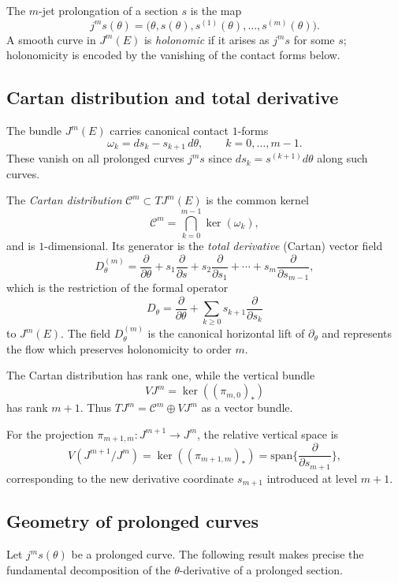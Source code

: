 \documentclass[3p,times]{elsarticle}
\begin{document}
The $m$-jet prolongation of a section $s$ is the map
\[
 j^{m}s(\theta)=\big(\theta, s(\theta), s^{(1)}(\theta),\ldots,s^{(m)}(\theta)\big).
\]
A smooth curve in $J^{m}(E)$ is \emph{holonomic} if it arises as $j^{m}s$ for some $s$; holonomicity is encoded
by the vanishing of the contact forms below.

\subsection{Cartan distribution and total derivative}

The bundle $J^{m}(E)$ carries canonical contact $1$-forms
\[
 \omega_k = ds_k - s_{k+1}\,d\theta,\qquad k=0,\ldots,m-1.
\]
These vanish on all prolonged curves $j^m s$ since $ds_k = s^{(k+1)} d\theta$ along such curves.

The {\em Cartan distribution} $\mathcal{C}^{m}\subset TJ^{m}(E)$ is the common kernel
\[
 \mathcal{C}^{m}=\bigcap_{k=0}^{m-1}\ker(\omega_k),
\]
and is $1$-dimensional.  Its generator is the {\em total derivative} (Cartan) vector field
\begin{equation}
\label{eq:total-derivative}
D^{(m)}_\theta
 = \frac{\partial}{\partial \theta} 
   + s_1\frac{\partial}{\partial s}
   + s_2\frac{\partial}{\partial s_1}
   + \cdots
   + s_m\frac{\partial}{\partial s_{m-1}},
\end{equation}
which is the restriction of the formal operator
\[
 D_\theta 
   = \frac{\partial}{\partial \theta}
     + \sum_{k\ge 0} s_{k+1}\frac{\partial}{\partial s_k}
\]
to $J^{m}(E)$.  
The field $D^{(m)}_\theta$ is the canonical horizontal lift of $\partial_\theta$ and represents the flow
which preserves holonomicity to order $m$.

The Cartan distribution has rank one, while the vertical bundle
\[
 VJ^{m}= \ker((\pi_{m,0})_*)
\]
has rank $m+1$.  Thus $TJ^{m}=\mathcal{C}^{m}\oplus VJ^{m}$ as a vector bundle.

For the projection $\pi_{m+1,m}:J^{m+1}\to J^{m}$, the relative vertical space is 
\[
 V(J^{m+1}/J^{m})
 = \ker((\pi_{m+1,m})_*)
 = \mathrm{span}\Big\{\frac{\partial}{\partial s_{m+1}}\Big\},
\]
corresponding to the new derivative coordinate $s_{m+1}$ introduced at level $m+1$.

\subsection{Geometry of prolonged curves}

Let $j^{m}s(\theta)$ be a prolonged curve.  
The following result makes precise the fundamental decomposition of the $\theta$-derivative of a prolonged section.
\end{document}
